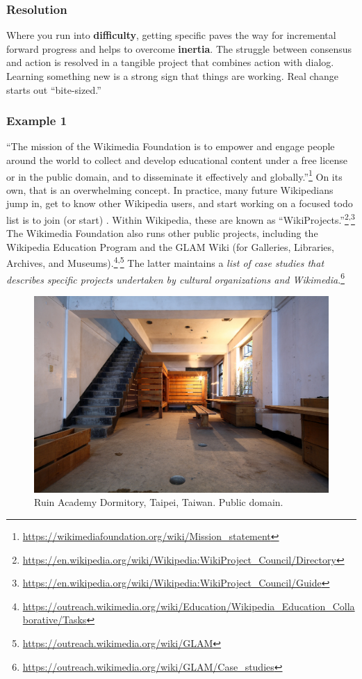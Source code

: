 \subsubsection*{Resolution}
Where you run into \textbf{difficulty}, getting specific paves the way for incremental forward progress and helps to overcome \textbf{inertia}.  The struggle between consensus and action is resolved in a tangible project that combines action with dialog.  Learning something new is a strong sign that things are working.
%
Real change starts out ``bite-sized.'' 

\subsubsection*{Example 1}
``The mission of the Wikimedia Foundation is to empower and engage people around the world to collect and develop educational content under a free license or in the public domain, and to disseminate it effectively and globally.''\footnote{\url{https://wikimediafoundation.org/wiki/Mission_statement}} On its own, that is an overwhelming concept.  In practice, many future Wikipedians jump in, get to know other Wikipedia users, and start working on a focused todo list is to join (or start)
.  Within Wikipedia, these are known
as
``WikiProjects.''\footnote{\url{https://en.wikipedia.org/wiki/Wikipedia:WikiProject_Council/Directory}}\textsuperscript{,}\footnote{\url{https://en.wikipedia.org/wiki/Wikipedia:WikiProject_Council/Guide}}
The Wikimedia Foundation also runs other public projects, including the Wikipedia Education Program and the GLAM Wiki (for Galleries, Libraries, Archives, and Museums).\footnote{\url{https://outreach.wikimedia.org/wiki/Education/Wikipedia_Education_Collaborative/Tasks}}\textsuperscript{,}\footnote{\url{https://outreach.wikimedia.org/wiki/GLAM}}  The latter maintains a \emph{list of case studies that describes specific projects undertaken by cultural organizations and Wikimedia}.\footnote{\url{https://outreach.wikimedia.org/wiki/GLAM/Case_studies}}

\begin{figure}
\vspace{-.5cm}
\begin{center}
\includegraphics[width=.45\textwidth]{Ruin_Academy_Dorm}
\end{center}
\vspace{-.5cm}
\caption{Ruin Academy Dormitory, Taipei, Taiwan. Public
  domain.
}
\vspace{-.3cm}
\end{figure}

